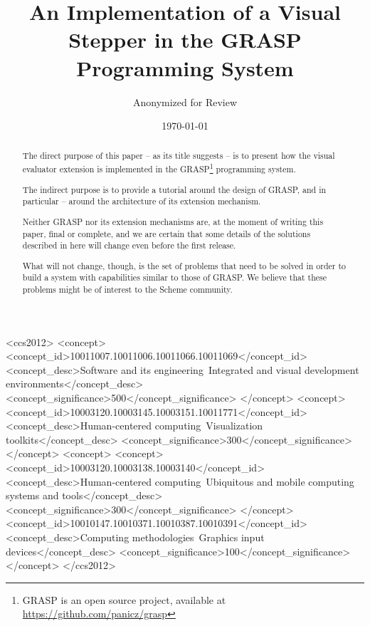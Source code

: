 \documentclass[acmsmall]{acmart}
\author{Anonymized for Review}
\date{\today}
\title{An Implementation of a Visual Stepper in the GRASP Programming System}
\begin{document}

\begin{abstract}
The direct purpose of this paper -- as its title suggests -- is to
present how the visual evaluator extension is implemented in the
GRASP\footnote{GRASP is an open source project, available at
\url{https://github.com/panicz/grasp}} programming system.

The indirect purpose is to provide a tutorial around the design
of GRASP, and in particular -- around the architecture of its extension
mechanism.

Neither GRASP nor its extension mechanisms are, at the moment of
writing this paper, final or complete, and we are certain that some
details of the solutions described in here will change even before the
first release.

What will not change, though, is the set of problems that need to be
solved in order to build a system with capabilities similar to those
of GRASP. We believe that these problems might be of interest to the
Scheme community.

\end{abstract}

\begin{CCSXML}
  <ccs2012>
  <concept>
  <concept_id>10011007.10011006.10011066.10011069</concept_id>
  <concept_desc>Software and its engineering~Integrated and visual development environments</concept_desc>
  <concept_significance>500</concept_significance>
  </concept>
  <concept>
  <concept_id>10003120.10003145.10003151.10011771</concept_id>
  <concept_desc>Human-centered computing~Visualization toolkits</concept_desc>
  <concept_significance>300</concept_significance>
  </concept>
  <concept>
  <concept>
  <concept_id>10003120.10003138.10003140</concept_id>
  <concept_desc>Human-centered computing~Ubiquitous and mobile computing systems and tools</concept_desc>
  <concept_significance>300</concept_significance>
  </concept>
  <concept_id>10010147.10010371.10010387.10010391</concept_id>
  <concept_desc>Computing methodologies~Graphics input devices</concept_desc>
  <concept_significance>100</concept_significance>
  </concept>
  </ccs2012>
\end{CCSXML}

\end{document}
